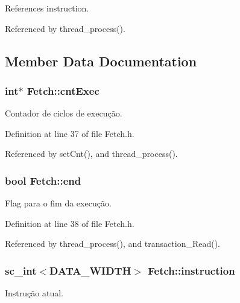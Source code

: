 References instruction.



Referenced by thread\+\_\+process().



\subsection{Member Data Documentation}
\hypertarget{classFetch_a9598888b1bb54bf4946efe56639279d8}{
\subsubsection[{cnt\+Exec}]{\setlength{\rightskip}{0pt plus 5cm}int$\ast$ Fetch\+::cnt\+Exec\hspace{0.3cm}{\ttfamily [private]}}}\label{classFetch_a9598888b1bb54bf4946efe56639279d8}
Contador de ciclos de execução. 

Definition at line 37 of file Fetch.\+h.



Referenced by set\+Cnt(), and thread\+\_\+process().

\hypertarget{classFetch_ae42d76542792425cdd2b896b4558cb8b}{
\subsubsection[{end}]{\setlength{\rightskip}{0pt plus 5cm}bool Fetch\+::end\hspace{0.3cm}{\ttfamily [private]}}}\label{classFetch_ae42d76542792425cdd2b896b4558cb8b}
Flag para o fim da execução. 

Definition at line 38 of file Fetch.\+h.



Referenced by thread\+\_\+process(), and transaction\+\_\+\+Read().

\hypertarget{classFetch_ab7c97d2c0dab91563c0f33ba6c6a4cb0}{
\subsubsection[{instruction}]{\setlength{\rightskip}{0pt plus 5cm}sc\+\_\+int$<${\bf D\+A\+T\+A\+\_\+\+W\+I\+D\+T\+H}$>$ Fetch\+::instruction\hspace{0.3cm}{\ttfamily [private]}}}\label{classFetch_ab7c97d2c0dab91563c0f33ba6c6a4cb0}
Instrução atual. 

